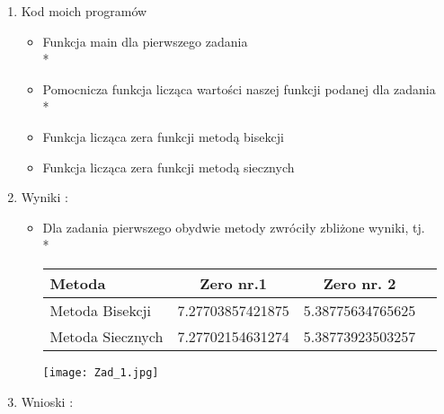 \documentclass[a4paper, 11pt]{article}
\begin{document}
\begin{enumerate}
\item Kod moich programów 
\begin{itemize}
\item Funkcja main dla pierwszego zadania \\*

\item Pomocnicza funkcja licząca wartości naszej funkcji podanej dla zadania \\*
 
 \item Funkcja licząca zera funkcji metodą bisekcji
 
 \item Funkcja licząca zera funkcji metodą siecznych
 
\end{itemize}
\item
Wyniki : 
\begin{itemize}
\item  Dla zadania pierwszego obydwie metody zwróciły zbliżone wyniki, tj.\\*
\begin{center}

	\begin{tabular}{ l*{2}{c}r}
  \hline	
	Metoda & Zero nr.1 & Zero nr. 2 \\ \hline
    Metoda Bisekcji & 7.27703857421875	& 5.38775634765625	\\
    Metoda Siecznych & 7.27702154631274	& 5.38773923503257 \\
  \hline
  \end{tabular}

\end{center}
\texttt{[image: Zad\_1.jpg]}
\end{itemize}
\item Wnioski : 
\end{enumerate}
\end{document}
